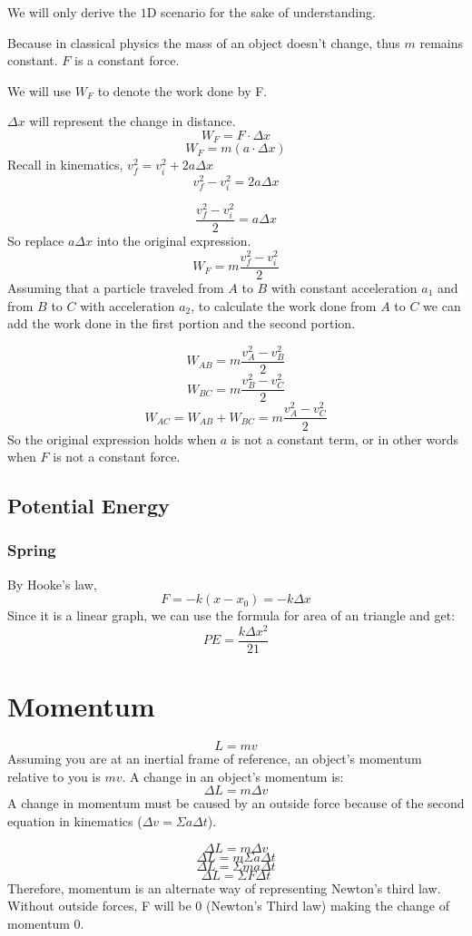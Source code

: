 \documentclass[]{article}
\begin{document}
	We will only derive the $1$D scenario for the sake of understanding. 
	
	Because in classical physics the mass of an object doesn't change, thus $m$ remains constant.
	$F$ is a constant force.
	
	We will use $W_F$ to denote the work done by F.
	
	$\Delta x$ will represent  the change in distance.
	$$W_F = F \cdot \Delta x$$
	$$W_F = m (a \cdot \Delta x)$$
	Recall in kinematics, $v_f^2 = v^2_i + 2a\Delta x$
	$$v_f^2 - v^2_i = 2a\Delta x$$
	
	$$\frac{v_f^2 - v^2_i}{2} = a\Delta x$$
	So replace $a\Delta x$ into the original expression.
	$$W_F = m \frac{v_f^2 - v^2_i}{2}$$
	Assuming that a particle traveled from $A$ to $B$ with constant acceleration $a_1$ and from $B$ to $C$ with acceleration $a_2$, to calculate the work done from $A$ to $C$ we can add the work done in the first portion and the second portion.
	
	$$W_{AB} = m\frac{v_A^2 -v_B^2}{2}$$
	$$W_{BC} = m\frac{v_B^2 -v_C^2}{2}$$ 
	$$W_{AC} = W_{AB} + W_{BC} = m\frac{v_A^2 -v_C^2}{2}$$
	So the original expression holds when $a$ is not a constant term, or in other words when $F$ is not a constant force. 
	\subsection{Potential Energy}
		\subsubsection{Spring}
			By Hooke's law, 
			$$F = -k (x-x_0) = -k\Delta x$$
			Since it is a linear graph, we can use the formula for area of an triangle and get:
				$$PE = \frac{k\Delta x^2}{21}$$	

		
\section{Momentum}
$$L = mv$$
Assuming you are at an inertial frame of reference, an object's momentum relative to you is $mv$. A change in an object's momentum is:
$$\Delta L = m \Delta v$$
A change in momentum must be caused by an outside force because of the second equation in kinematics ($\Delta v = \Sigma a\Delta t$).

$$\Delta L = m\Delta v$$
$$\Delta L = m\Sigma a \Delta t$$
$$\Delta L = \Sigma m a \Delta t$$
$$\Delta L = \Sigma F \Delta t$$
Therefore, momentum is an alternate way of representing Newton's third law. Without outside forces, F will be $0$ (Newton's Third law) making the change of momentum $0$. 
 
\end{document}
